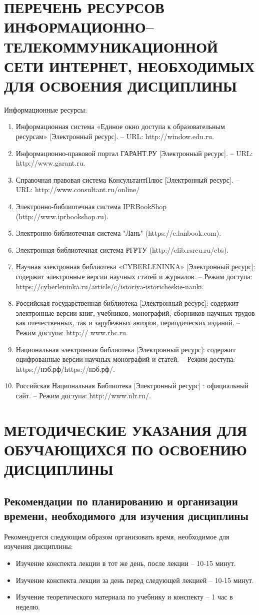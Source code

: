 \chapter{ПЕРЕЧЕНЬ РЕСУРСОВ ИНФОРМАЦИОННО–ТЕЛЕКОММУНИКАЦИОННОЙ СЕТИ ИНТЕРНЕТ, НЕОБХОДИМЫХ ДЛЯ ОСВОЕНИЯ ДИСЦИПЛИНЫ}
\label{chapt8}
Информационные ресурсы:
\begin{enumerate}
\item Информационная система «Единое окно доступа к образовательным ресурсам» [Электронный ресурс]. – URL: http://window.edu.ru.
\item Информационно-правовой портал ГАРАНТ.РУ [Электронный ресурс]. – URL: http://www.garant.ru. 
\item Справочная правовая система КонсультантПлюс [Электронный ресурс]. – URL: http://www.consultant.ru/online/
\item Электронно-библиотечная система IPRBookShop (http://www.iprbookshop.ru).
\item Электронно-библиотечная система "Лань" (https://e.lanbook.com).
\item Электронная библиотечная система РГРТУ (http://elib.rsreu.ru/ebs).
\item Научная электронная библиотека «CYBERLENINKA» [Электронный ресурс]: содержит электронные версии научных статей и журналов. – Режим доступа: https://cyberleninka.ru/article/c/istoriya-istoricheskie-nauki. 
\item Российская государственная библиотека [Электронный ресурс]: содержит электронные версии книг, учебников, монографий, сборников научных трудов как отечественных, так и зарубежных авторов, периодических изданий. – Режим доступа: http:// www.rbc.ru.
\item Национальная электронная библиотека [Электронный ресурс]: содержит оцифрованные версии научных монографий и статей. – Режим доступа: https://нэб.рф/https://нэб.рф/.
\item Российская Национальная Библиотека [Электронный ресурс] : официальный сайт. – Режим доступа: http://www.nlr.ru/. 
\end{enumerate}

\chapter{МЕТОДИЧЕСКИЕ УКАЗАНИЯ ДЛЯ ОБУЧАЮЩИХСЯ ПО ОСВОЕНИЮ ДИСЦИПЛИНЫ}
\label{chapt9}

\section{Рекомендации по планированию и организации времени, необходимого для изучения дисциплины}
Рекомендуется следующим образом организовать время, необходимое для изучения дисциплины:
\begin{itemize}
\item Изучение конспекта лекции в тот же день, после лекции – 10-15 минут.
\item Изучение конспекта лекции за день перед следующей лекцией – 10-15 минут.
\item Изучение теоретического материала по учебнику и конспекту – 1 час в неделю.
\end{itemize}

